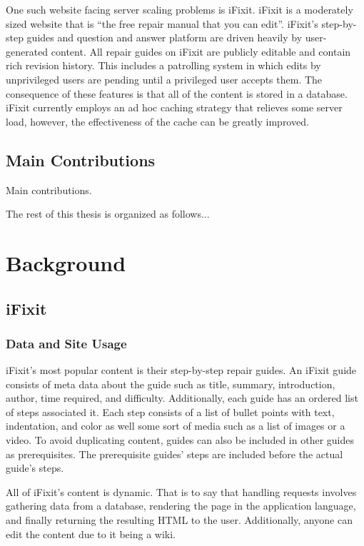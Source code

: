 \documentclass[12pt]{ucthesis}
\begin{document}
One such website facing server scaling problems is {\textsf iFixit}.
{\textsf iFixit} is a moderately sized website that is ``the free repair manual that you can edit''\cite{ifixitDotCom}.
{\textsf iFixit}'s step-by-step guides and question and answer platform are driven heavily by user-generated content.
All repair guides on iFixit are publicly editable and contain rich revision history.
This includes a patrolling system in which edits by unprivileged users are pending until a privileged user accepts them.
The consequence of these features is that all of the content is stored in a database.
{\textsf iFixit} currently employs an ad hoc caching strategy that relieves some server load, however, the effectiveness of the cache can be greatly improved.


\section{Main Contributions}
Main contributions.

The rest of this thesis is organized as follows...


\chapter{Background}
\label{background}

\section{iFixit}
\subsection{Data and Site Usage}
iFixit's most popular content is their step-by-step repair guides.
An iFixit guide consists of meta data about the guide such as title, summary, introduction, author, time required, and difficulty.
Additionally, each guide has an ordered list of steps associated it.
Each step consists of a list of bullet points with text, indentation, and color as well some sort of media such as a list of images or a video.
To avoid duplicating content, guides can also be included in other guides as prerequisites.
The prerequisite guides' steps are included before the actual guide's steps.

All of iFixit's content is dynamic.
That is to say that handling requests involves gathering data from a database, rendering the page in the application language, and finally returning the resulting HTML to the user.
Additionally, anyone can edit the content due to it being a wiki.
\end{document}
